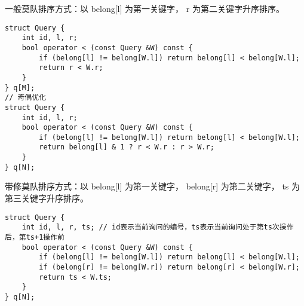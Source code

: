 一般莫队排序方式：以 belong[l] 为第一关键字， r 为第二关键字升序排序。

\begin{lstlisting}
struct Query {
    int id, l, r;
    bool operator < (const Query &W) const {
        if (belong[l] != belong[W.l]) return belong[l] < belong[W.l];
        return r < W.r;
    }
} q[M];
// 奇偶优化
struct Query {
	int id, l, r;
	bool operator < (const Query &W) const {
        if (belong[l] != belong[W.l]) return belong[l] < belong[W.l];
        return belong[l] & 1 ? r < W.r : r > W.r;  
	}
} q[N];
\end{lstlisting}
    

带修莫队排序方式：以 belong[l] 为第一关键字， belong[r] 为第二关键字， ts 为第三关键字升序排序。

\begin{lstlisting}
struct Query {
    int id, l, r, ts; // id表示当前询问的编号，ts表示当前询问处于第ts次操作后，第ts+1操作前
    bool operator < (const Query &W) const {
        if (belong[l] != belong[W.l]) return belong[l] < belong[W.l];
        if (belong[r] != belong[W.r]) return belong[r] < belong[W.r];
        return ts < W.ts;
    }
} q[N];
\end{lstlisting}
